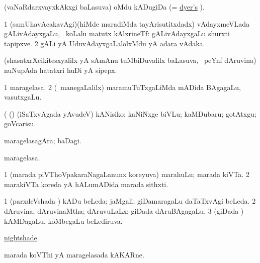 \bentry
{} 
\gl{\nA}
\expl{}
\bmng
(vaNaRdarxvayxkAkxgi baLasuva) oMdu kADugiDa (= \hyperref{kandict_d.pdf}{D}{dyer pagu(1)}{dyer's} ). 
\emng
\eentry

\bentry
{} 
\gl{\nA}
\expl{}
\bmng
\bnum
\num{1} (samUhavAcakavAgi)(hiMde maradiMda tayArisutitxdadx) vAdayxmeVLada gALivAdayxgaLu, \udA\ koLalu matutx kAlxrineTf:  gALivAdayxgaLu shurxti tapipxve. 
\num{2} gALi yA UduvAdayxgaLalolxMdu yA adara vAdaka. 
\enum
\emng
\eentry

\bentry
{} 
\gl{\nA}
\expl{}
\bmng
(shasatxrXcikitesxyalilx yA sAmAnu tuMbiDuvalilx baLasuva, \sA\ peYnf dAruvina) nuNupAda hatatxri huDi yA sipepx. 
\emng
\eentry

\bentry
{} 
\gl{\nA}
\expl{}
\bmng
\bnum
\num{1} maragelasa. 
\num{2} (\kanmu\ manegaLalilx) maramuTuTxgaLiMda mADida BAgagaLu, vasutxgaLu. 
\enum
\emng

\noindent
\gl{\pagu}
\expl{}
\bmng
{} (  (\AmA) (iSaTxvAgada yAvudeV) kANisiko; kaNiNxge biVLu; kaMDubaru; gotAtxgu; goVcarisu. 
\emng
\eentry

\bentry 
{} 
\gl{\nA}
\expl{}
\bmng
maragelasagAra; baDagi. 
\emng
\eentry

\bentry
{} 
\gl{\nA}
\expl{}
\bmng
maragelasa. 
\emng
\eentry

\bentry
{} 
\gl{\nA}
\expl{}
\bmng
\bnum
\num{1} (marada piVThoVpakaraNagaLanunx koreyuva) marahuLu; marada kiVTa. 
\num{2} marakiVTa koreda yA hALumADida marada sithxti. 
\enum
\emng
\eentry

\bentry
{} 
\gl{\gu}
\bmng
\bnum
\num{1} (parxdeVshada \vi) kADu beLeda; jaMgali; giDamaragaLu daTaTxvAgi beLeda. 
\num{2} dAruvina; dAruvinaMtha; dAruvuLaLx:  giDada dAruBAgagaLu. 
\num{3} (giDada \vi) kAMDagaLu, koMbegaLu beLediruva. 
\enum
\emng

\noindent
\gl{\pagu}
\expl{}
\bmng
{} \hyperref{kandict_n.pdf}{N}{nightshade pagu(3)}{nightshade}. 
\emng
\eentry

\bentry
{} 
\gl{\nA}
\expl{}
\bmng
marada koVThi yA maragelasada kAKARne. 
\emng
\eentry


